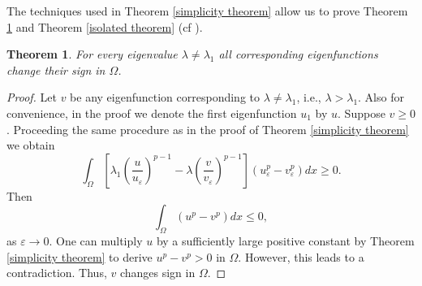 \documentclass[a4paper,12pt,reqno]{amsart}
\numberwithin{equation}{section}
\theoremstyle{plain}
\newtheorem{thm}{Theorem}[section]
\theoremstyle{definition}
\begin{document}
The techniques used in Theorem \ref{simplicity theorem} allow us to prove Theorem \ref{change sign theorem} and Theorem \ref{isolated theorem} (cf \cite{AL1987}).
\begin{thm}\label{change sign theorem}
For every eigenvalue $\lambda\neq \lambda_{1}$  all corresponding eigenfunctions change their sign in $\Omega$.
\end{thm}
\begin{proof}
Let $v$ be any eigenfunction corresponding to $\lambda\neq\lambda_{1}$, i.e., $\lambda> \lambda_{1}$. Also for convenience, in the proof we denote the first eigenfunction $u_{1}$ by $u$. Suppose $v\geq 0$. Proceeding the same procedure as in the proof of Theorem \ref{simplicity theorem} we obtain
\begin{equation*}
\int_{\Omega}\left[\lambda_{1}\left(\frac{u}{u_{\varepsilon}}\right)^{p-1}-\lambda\left(\frac{v}{v_{\varepsilon}}\right)^{p-1}\right]\left(u_{\varepsilon}^{p}-v_{\varepsilon}^{p}\right) d x \geq 0.    
\end{equation*}
Then
\begin{equation*}
\int_{\Omega}\left(u^{p}-v^{p}\right) d x \leq 0,  
\end{equation*}
as $\varepsilon\to 0$. One can multiply $u$ by a sufficiently large positive constant by Theorem \ref{simplicity theorem} to derive $u^{p}-v^{p}>0$ in $\Omega$. However, this leads to a contradiction. Thus, $v$ changes sign in $\Omega$.
\end{proof}
\end{document}
